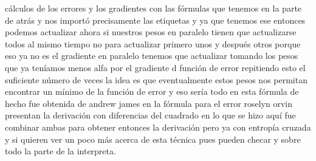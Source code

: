 cálculos de los errores y los gradientes con las fórmulas que tenemos en la parte de atrás y nos importó precisamente las etiquetas y ya que tenemos ese entonces podemos actualizar ahora si nuestros pesos en paralelo tienen que actualizarse todos al mismo tiempo no para actualizar primero unos y después otros porque eso ya no es el gradiente en paralelo tenemos que actualizar tomando los pesos que ya teníamos menos alfa por el gradiente d función de error repitiendo esto el suficiente número de veces la idea es que eventualmente estos pesos nos permitan encontrar un mínimo de la función de error y eso sería todo en esta fórmula de hecho fue obtenida de andrew james en la fórmula para el error roselyn orvin presentan la derivación con diferencias del cuadrado en lo que se hizo aquí fue combinar ambas para obtener entonces la derivación pero ya con entropía cruzada y si quieren ver un poco más acerca de esta técnica pues pueden checar y sobre todo la parte de la interpreta.
